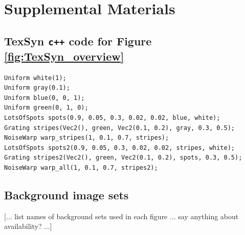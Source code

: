 \documentclass[acmtog]{acmart}
\begin{document}





\newpage
\onecolumn
\appendix
\section{Supplemental Materials}


\subsection{TexSyn \texttt{c++} code for Figure \ref{fig:TexSyn_overview}}
\begin{small}
\begin{verbatim}
Uniform white(1);
Uniform gray(0.1);
Uniform blue(0, 0, 1);
Uniform green(0, 1, 0);
LotsOfSpots spots(0.9, 0.05, 0.3, 0.02, 0.02, blue, white);
Grating stripes(Vec2(), green, Vec2(0.1, 0.2), gray, 0.3, 0.5);
NoiseWarp warp_stripes(1, 0.1, 0.7, stripes);
LotsOfSpots spots2(0.9, 0.05, 0.3, 0.02, 0.02, stripes, white);
Grating stripes2(Vec2(), green, Vec2(0.1, 0.2), spots, 0.3, 0.5);
NoiseWarp warp_all(1, 0.1, 0.7, stripes2);
\end{verbatim}
\end{small}


\subsection{Background image sets}
[... list names of background sets used in each figure ... say anything about availability? ...]
\end{document}
